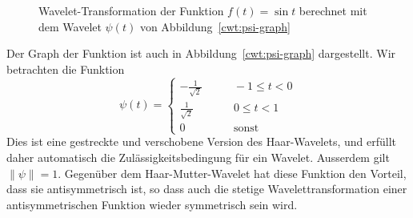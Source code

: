 \begin{beispiel}
\begin{figure}
\caption{Wavelet-Transformation der Funktion $f(t)=\sin t$ berechnet
mit dem Wavelet $\psi(t)$ von Abbildung~\ref{cwt:psi-graph}
\label{cwt:psi-cwt}}
\end{figure}
Der Graph der Funktion ist auch in Abbildung~\ref{cwt:psi-graph} dargestellt.
Wir betrachten die Funktion
\[
\psi(t) = \begin{cases}
-\frac1{\sqrt{2}}&\qquad -1\le t< 0\\
\frac1{\sqrt{2}}&\qquad 0\le t< 1\\
0&\qquad\text{sonst}
\end{cases}
\]
Dies ist eine gestreckte und verschobene Version des Haar-Wavelets,
und erfüllt daher automatisch die Zulässigkeitsbedingung für ein Wavelet.
Ausserdem gilt $\|\psi\|=1$.
Gegenüber dem Haar-Mutter-Wavelet hat diese Funktion den Vorteil, dass 
sie antisymmetrisch ist, so dass auch die stetige Wavelettransformation
einer antisymmetrischen Funktion wieder symmetrisch sein wird.


\end{beispiel}
